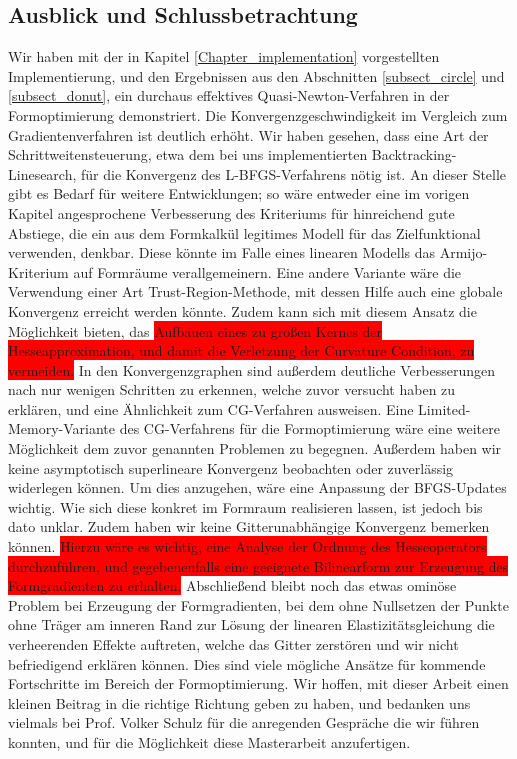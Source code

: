 \subsection{Ausblick und Schlussbetrachtung}
Wir haben mit der in Kapitel \ref{Chapter_implementation} vorgestellten Implementierung, und den Ergebnissen aus den Abschnitten \ref{subsect_circle} und \ref{subsect_donut}, ein durchaus effektives Quasi-Newton-Verfahren in der Formoptimierung demonstriert. 
Die Konvergenzgeschwindigkeit im Vergleich zum Gradientenverfahren ist deutlich erhöht. Wir haben gesehen, dass eine Art der Schrittweitensteuerung, etwa dem bei uns implementierten Backtracking-Linesearch, für die Konvergenz des L-BFGS-Verfahrens nötig ist. An dieser Stelle gibt es Bedarf für weitere Entwicklungen; so wäre entweder eine im vorigen Kapitel angesprochene Verbesserung des Kriteriums für hinreichend gute Abstiege, die ein aus dem Formkalkül legitimes Modell für das Zielfunktional verwenden, denkbar. Diese könnte im Falle eines linearen Modells das Armijo-Kriterium auf Formräume verallgemeinern. Eine andere Variante wäre die Verwendung einer Art Trust-Region-Methode, mit dessen Hilfe auch eine globale Konvergenz erreicht werden könnte. Zudem kann sich mit diesem Ansatz die Möglichkeit bieten, das \colorbox{red}{Aufbauen eines zu großen Kernes der Hesseapproximation, und damit die Verletzung der Curvature Condition, zu vermeiden.} In den Konvergenzgraphen sind außerdem deutliche Verbesserungen nach nur wenigen Schritten zu erkennen, welche zuvor versucht haben zu erklären, und eine Ähnlichkeit zum CG-Verfahren ausweisen. Eine Limited-Memory-Variante des CG-Verfahrens für die Formoptimierung wäre eine weitere Möglichkeit dem zuvor genannten Problemen zu begegnen. Außerdem haben wir keine asymptotisch superlineare Konvergenz beobachten oder zuverlässig widerlegen können. Um dies anzugehen, wäre eine Anpassung der BFGS-Updates wichtig. Wie sich diese konkret im Formraum realisieren lassen, ist jedoch bis dato unklar. Zudem haben wir keine Gitterunabhängige Konvergenz bemerken können. \colorbox{red}{Hierzu wäre es wichtig, eine Analyse der Ordnung des Hesseoperators durchzuführen, und gegebenenfalls eine geeignete Bilinearform zur Erzeugung des Formgradienten zu erhalten.} Abschließend bleibt noch das etwas ominöse Problem bei Erzeugung der Formgradienten, bei dem ohne Nullsetzen der Punkte ohne Träger am inneren Rand zur Lösung der linearen Elastizitätsgleichung die verheerenden Effekte auftreten, welche das Gitter zerstören und wir nicht befriedigend erklären können. Dies sind viele mögliche Ansätze für kommende  Fortschritte im Bereich der Formoptimierung. Wir hoffen, mit dieser Arbeit einen kleinen Beitrag in die richtige Richtung geben zu haben, und bedanken uns vielmals bei Prof. Volker Schulz für die anregenden Gespräche die wir führen konnten, und für die Möglichkeit diese Masterarbeit anzufertigen.
\newpage
\nocite{*}




